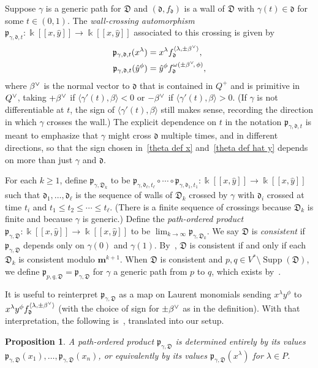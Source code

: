 \documentclass[10pt,a4paper]{amsart}
\newtheorem{prop}[theorem]{Proposition}
\theoremstyle{definition}
\DeclareMathOperator{\Supp}{Supp}
\newcommand{\newword}[1]{\emph{#1}}
\newcommand\llbracket{[\![}
\newcommand\rrbracket{]\!]}
\newcommand{\br}[1]{{\langle #1 \rangle}}
\newcommand{\D}{{\mathfrak D}}
\newcommand{\p}{{\mathfrak p}}
\newcommand{\ck}{\spcheck}
\newcommand{\m}{\mathbf{m}}
\renewcommand{\k}{\Bbbk}
\renewcommand{\d}{{\mathfrak d}}
\newcommand{\hy}{\hat{y}}
\begin{document}
Suppose $\gamma$ is a generic path for $\D$ and $(\d,f_\d)$ is a wall of $\D$ with $\gamma(t)\in\d$ for some $t\in(0,1)$.
The \newword{wall-crossing automorphism} $\p_{\gamma,\d,t}:\k\llbracket x,\hy\rrbracket \to\k\llbracket x,\hat y\rrbracket $ associated to this crossing is given by 
\begin{align}
\label{theta def x}
\p_{\gamma,\d,t}(x^\lambda)&=x^\lambda f_\d^{\br{\lambda,\pm\beta\ck}},\\
\label{theta def hat y}
\p_{\gamma,\d,t}(\hy^\phi)&=\hy^\phi f_\d^{\omega(\pm\beta\ck\!,\,\phi)},
\end{align}
where $\beta\ck$ is the normal vector to $\d$ that is contained in $Q^+$ and is primitive in $Q\ck$, taking $+\beta\ck$ if $\br{\gamma'(t),\beta}<0$ or $-\beta\ck$ if $\br{\gamma'(t),\beta}>0$.
(If $\gamma$ is not differentiable at $t$, the sign of $\br{\gamma'(t),\beta}$ still makes sense, recording the direction in which $\gamma$ crosses the wall.)
The explicit dependence on $t$ in the notation $\p_{\gamma,\d,t}$ is meant to emphasize that $\gamma$ might cross $\d$ multiple times, and in different directions, so that the sign chosen in~\eqref{theta def x} and~\eqref{theta def hat y} depends on more than just $\gamma$ and $\d$.

For each $k\ge 1$, define $\p_{\gamma,\D_k}$ to be $\p_{\gamma,\d_\ell,t_\ell}\circ\cdots\circ\p_{\gamma,\d_1,t_1}:\k\llbracket x,\hy\rrbracket \to\k\llbracket x,\hy\rrbracket $ such that $\d_1,\ldots,\d_\ell$ is the sequence of walls of $\D_k$ crossed by $\gamma$ with $\d_i$ crossed at time $t_i$ and $t_1\le t_2\le\cdots\le t_\ell$.
(There is a finite sequence of crossings because $\D_k$ is finite and because $\gamma$ is generic.)
Define the \newword{path-ordered product} $\p_{\gamma,\D}:\k\llbracket x,\hy\rrbracket \to\k\llbracket x,\hy\rrbracket $ to be $\lim_{k\to\infty}\p_{\gamma,\D_k}$.
We say $\D$ is \newword{consistent} if $\p_{\gamma,\D}$ depends only on $\gamma(0)$ and $\gamma(1)$.
By~\cite[Proposition~2.4]{scatfan}, $\D$ is consistent if and only if each $\D_k$ is consistent modulo $\m^{k+1}$.
When $\D$ is consistent and $p,q\in V^*\setminus\Supp(\D)$, we define $\p_{p,q,\D}=\p_{\gamma,\D}$ for $\gamma$ a generic path from $p$ to $q$, which exists by~\cite[Proposition~2.2]{scatfan}.

It is useful to reinterpret $\p_{\gamma,\D}$ as a map on Laurent monomials sending $x^\lambda y^\phi$ to $x^\lambda y^\phi f_\d^{\br{\lambda,\pm\beta\ck}}$ (with the choice of sign for $\pm\beta\ck$ as in the definition).
With that interpretation, the following is~\cite[Proposition~2.5]{scatfan}, translated into our setup.
\begin{prop}\label{just x's} 
A path-ordered product $\p_{\gamma,\D}$ is determined entirely by its values $\p_{\gamma,\D}(x_1),\ldots,\p_{\gamma,\D}(x_n)$, or equivalently by its values $\p_{\gamma,\D}(x^\lambda)$ for $\lambda\in P$.
\end{prop}
\end{document}
